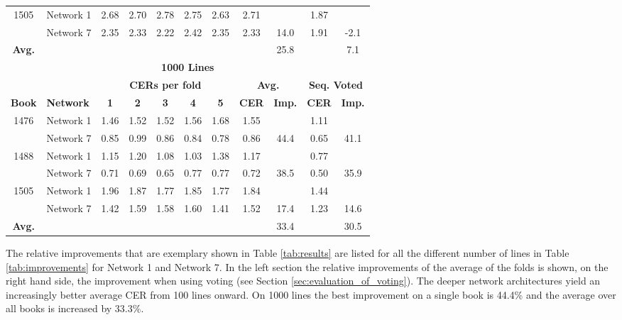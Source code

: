 \documentclass{jlcl}
\begin{document}
\begin{table}[tp]
\begin{tabular}{c|l|ccccc|cc|cc}
        1505 & Network 1 & 2.68 & 2.70 & 2.78 & 2.75 & 2.63 & 2.71 &      & 1.87 &       \\
             & Network 7 & 2.35 & 2.33 & 2.22 & 2.42 & 2.35 & 2.33 & 14.0 & 1.91 &  -2.1 \\
        \hline
        \textbf{Avg.} &         &      &      &      &      &      &      & 25.8 &      &   7.1 \\
        \hline
        \hline
        \multicolumn{11}{c}{\textbf{1000 Lines}} \\
        \hline
        \hline
             &       &\multicolumn{5}{c|}{\textbf{CERs per fold}} & \multicolumn{2}{c}{\textbf{Avg.}} & \multicolumn{2}{c}{\textbf{Seq. Voted}} \\
        \hline
        \textbf{Book} & \textbf{Network} & \textbf{1} & \textbf{2} & \textbf{3} & \textbf{4} & \textbf{5} & \textbf{CER} & \textbf{Imp.} & \textbf{CER} & \textbf{Imp.} \\
        \hline
        1476 & Network 1 & 1.46 & 1.52 & 1.52 & 1.56 & 1.68 & 1.55 &      & 1.11 &       \\
             & Network 7 & 0.85 & 0.99 & 0.86 & 0.84 & 0.78 & 0.86 & 44.4 & 0.65 &  41.1 \\
        1488 & Network 1 & 1.15 & 1.20 & 1.08 & 1.03 & 1.38 & 1.17 &      & 0.77 &       \\
             & Network 7 & 0.71 & 0.69 & 0.65 & 0.77 & 0.77 & 0.72 & 38.5 & 0.50 &  35.9 \\
        1505 & Network 1 & 1.96 & 1.87 & 1.77 & 1.85 & 1.77 & 1.84 &      & 1.44 &       \\
             & Network 7 & 1.42 & 1.59 & 1.58 & 1.60 & 1.41 & 1.52 & 17.4 & 1.23 &  14.6 \\
        \hline
        \textbf{Avg.} &         &      &      &      &      &      &      & 33.4 &      &  30.5 \\
        \hline
        
    \end{tabular}
\end{table}

The relative improvements that are exemplary shown in Table \ref{tab:results} are listed for all the different number of lines in Table \ref{tab:improvements} for Network 1 and Network 7.
In the left section the relative improvements of the average of the folds is shown, on the right hand side, the improvement when using voting (see Section \ref{sec:evaluation_of_voting}).
The deeper network architectures yield an increasingly better average CER from 100 lines onward.
On 1000 lines the best improvement on a single book is 44.4\% and the average over all books is increased by 33.3\%.
\end{document}
